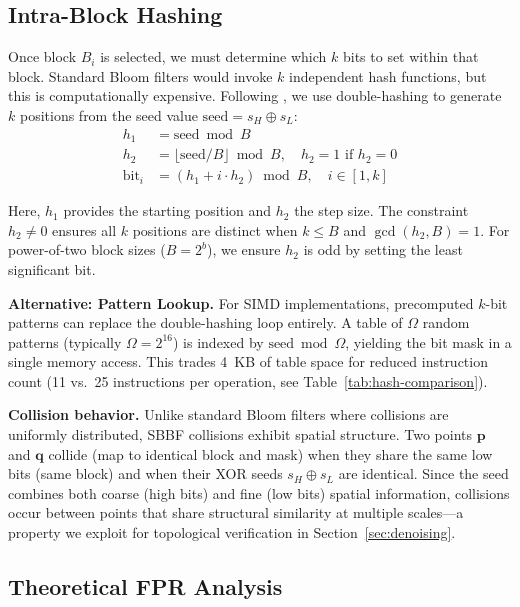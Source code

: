 \documentclass[conference,a4paper]{IEEEtran}
\begin{document}
\subsection{Intra-Block Hashing}
Once block $B_i$ is selected, we must determine which $k$ bits to set within that block. Standard Bloom filters would invoke $k$ independent hash functions, but this is computationally expensive. Following \citet{Kirsch2008}, we use double-hashing to generate $k$ positions from the seed value $\text{seed} = s_H \oplus s_L$:
\begin{align}
    h_1 &= \text{seed} \bmod B \\
    h_2 &= \lfloor \text{seed} / B \rfloor \bmod B, \quad h_2 = 1 \text{ if } h_2 = 0 \\
    \text{bit}_i &= (h_1 + i \cdot h_2) \bmod B, \quad i \in [1, k]
\end{align}

Here, $h_1$ provides the starting position and $h_2$ the step size. The constraint $h_2 \neq 0$ ensures all $k$ positions are distinct when $k \leq B$ and $\gcd(h_2, B) = 1$. For power-of-two block sizes ($B = 2^b$), we ensure $h_2$ is odd by setting the least significant bit.

\textbf{Alternative: Pattern Lookup.} For SIMD implementations, precomputed $k$-bit patterns can replace the double-hashing loop entirely. A table of $\Omega$ random patterns (typically $\Omega = 2^{16}$) is indexed by $\text{seed} \bmod \Omega$, yielding the bit mask in a single memory access. This trades 4~KB of table space for reduced instruction count (11 vs.\ 25 instructions per operation, see Table~\ref{tab:hash-comparison}).

\textbf{Collision behavior.} Unlike standard Bloom filters where collisions are uniformly distributed, SBBF collisions exhibit spatial structure. Two points $\mathbf{p}$ and $\mathbf{q}$ collide (map to identical block and mask) when they share the same low bits (same block) and when their XOR seeds $s_H \oplus s_L$ are identical. Since the seed combines both coarse (high bits) and fine (low bits) spatial information, collisions occur between points that share structural similarity at multiple scales---a property we exploit for topological verification in Section~\ref{sec:denoising}.

\subsection{Theoretical FPR Analysis}
\label{sec:theoretical-fpr}
\end{document}
